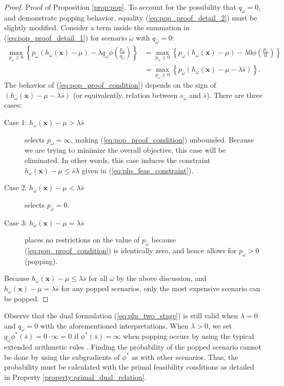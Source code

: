 \documentclass[opre,nonblindrev]{informs3} %
\newcommand{\x}{\mathbf{x}}
\begin{document}
\begin{proof}{\sc Proof of Proposition \ref{prop:pop}.}
	To account for the possibility that $q_\omega = 0$, and demonstrate popping behavior, equality (\ref{eq:pop_proof_detail_2}) must be slightly modified.
	Consider a term inside the summation in (\ref{eq:pop_proof_detail_1}) for scenario $\bar{\omega}$  with $q_{\bar{\omega}} = 0$:
	\begin{align}
		\max_{p_{\bar{\omega}} \geq 0} \left\{ p_{\bar{\omega}} (h_{\bar{\omega}}(\x) - \mu) - \lambda q_{\bar{\omega}}  \phi\left(\frac{p_{\bar{\omega}}}{q_{\bar{\omega}}}\right) \right\} & = \max_{p_{\bar{\omega}} \geq 0} \left\{ p_{\bar{\omega}} (h_{\bar{\omega}}(\x) - \mu) - \lambda 0  \phi\left(\frac{p_{\bar{\omega}}}{0}\right) \right\} \nonumber \\
		& = \max_{p_{\bar{\omega}} \geq 0} \left\{ p_{\bar{\omega}} \left( h_{\bar{\omega}}(\x) - \mu - \lambda \bar{s} \right) \right\}. \label{eq:pop_proof_condition}
	\end{align}
	The behavior of (\ref{eq:pop_proof_condition}) depends on the sign of $\left( h_{\bar{\omega}}(\x) - \mu - \lambda \bar{s}  \right)$ (or equivalently, relation between $s_{\bar{\omega}}$ and $\bar{s}$).
	There are three cases:
	\begin{description}
		\item[Case 1: $h_{\bar{\omega}}(\x) - \mu > \lambda \bar{s}$] selects $p_{\bar{\omega}} = \infty$, making (\ref{eq:pop_proof_condition}) unbounded. 
			Because we are trying to minimize the overall objective, this case will be eliminated. 
			In other words, this case induces the constraint $h_{\bar{\omega}}(\x) - \mu \leq \bar{s} \lambda$ given in (\ref{eq:plp_feas_constraint}). 
		\item[Case 2:  $h_{\bar{\omega}}(\x) - \mu < \lambda \bar{s}$] selects $p_{\bar{\omega}} = 0$.
		\item[Case 3: $h_{\bar{\omega}}(\x) - \mu = \lambda \bar{s}$] places no restrictions on the value of $p_{\bar{\omega}}$ because (\ref{eq:pop_proof_condition}) is identically zero, and hence allows for $p_{\bar{\omega}} > 0$ (popping). 
	\end{description}
	Because $h_{\bar{\omega}}(\x) - \mu \leq \lambda \bar{s}$ for all ${\bar{\omega}}$ by the above discussion, and $h_{\bar{\omega}}(\x) - \mu = \lambda \bar{s}$ for any popped scenarios, only the most expensive scenario can be popped.
	\Halmos
\end{proof}


Observe that the dual formulation (\ref{eq:plp_two_stage}) is still valid when $\lambda=0$ and $q_{\bar{\omega}} = 0$ with the aforementioned interpretations. 
When $\lambda>0$, we set  $q_{\bar{\omega}}\phi^*(\bar{s}) = 0 \cdot \infty = 0$ if $\phi^*(\bar{s})= \infty$ when popping occurs by using the typical extended arithmetic rules \citep[]{rockafellar_70}. 
Finding the probability of the popped scenario cannot be done by using the subgradients of $\phi^*$ as with other scenarios.
Thus, the probability must be calculated with the primal feasibility conditions as detailed in Property \ref{property:primal_dual_relation}.
\end{document}
